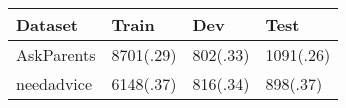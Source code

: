 \begin{tabular}{llll}
	\toprule
    \textbf{Dataset} & \textbf{Train} & \textbf{Dev} & \textbf{Test} \\
    \midrule
    AskParents & 8701(.29) & 802(.33) & 1091(.26)\\
    \midrule
    needadvice & 6148(.37) & 816(.34) & 898(.37) \\
    \bottomrule
\end{tabular}
